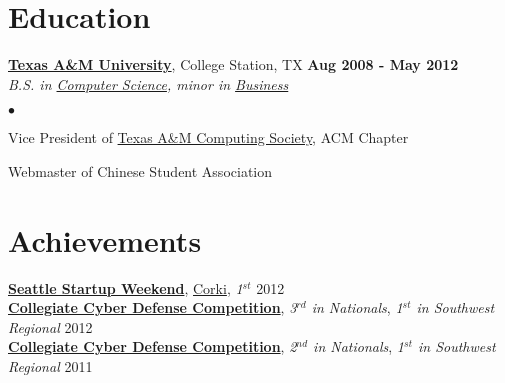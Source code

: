 \documentclass[margin,line]{res}
\newenvironment{list2}
  {\vspace{-4mm}
   \begin{list}{$\bullet$}{
     \setlength{\itemsep}{0in}
     \setlength{\parsep}{0in} \setlength{\parskip}{0in}
     \setlength{\topsep}{0in} \setlength{\partopsep}{0in}
     \setlength{\leftmargin}{0.18in}}}
  {\end{list}}
\begin{document}
\begin{resume}
\section{\sc Education}
{\bf \href{http://tamu.edu}{Texas A\&M University}}, College Station, TX \hfill {\bf Aug 2008 - May 2012} \\
{\em B.S. in \href{http://cs.tamu.edu}{Computer Science}, minor in \href{http://mays.tamu.edu}{Business}} \\
\begin{list2}
\item Vice President of \href{http://tacs.tamu.edu}{Texas A\&M Computing Society}, ACM Chapter
\item Webmaster of Chinese Student Association
\end{list2}


%
%
\section{\sc Achievements}
{\bf \href{http://seattle.startupweekend.org/}{Seattle Startup Weekend}}, \href{http://seattle.startupweekend.org/2012/11/26/seattle-startup-weekend-global-startup-battle-edition-winners-more/}{Corki},  {\em 1$^{st}$} \hfill 2012 \\
{\bf \href{http://www.nationalccdc.org/}{Collegiate Cyber Defense Competition}}, {\em 3$^{rd}$ in Nationals}, {\em 1$^{st}$ in Southwest Regional}  \hfill 2012 \\
{\bf \href{http://www.nationalccdc.org/}{Collegiate Cyber Defense Competition}}, {\em 2$^{nd}$ in Nationals}, {\em 1$^{st}$ in Southwest Regional}  \hfill 2011 \\
\vspace*{-5mm}



\end{resume}
\end{document}
